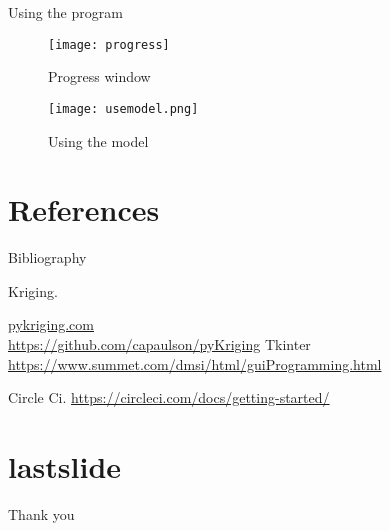 \documentclass{beamer}
\begin{document}
\begin{frame}{Using the program}
\begin{figure}[H]
	\texttt{[image: progress]}
	\caption{Progress window}
\end{figure}
\begin{figure}[H]
	\texttt{[image: usemodel.png]}
	\caption{Using the model}
\end{figure}

\end{frame}


\section*{References}
\begin{frame}{Bibliography}
  \begin{thebibliography}{10}
    

    Kriging.
   
  \url{pykriging.com} \\
  \url{https://github.com/capaulson/pyKriging}
    Tkinter
  \url{https://www.summet.com/dmsi/html/guiProgramming.html}
  
  	Circle Ci.
  	\url{https://circleci.com/docs/getting-started/}
  \end{thebibliography}

\end{frame}

\section*{lastslide}
\begin{frame}
\begin{center}
\Huge Thank you
\end{center}
\end{frame}
\end{document}
